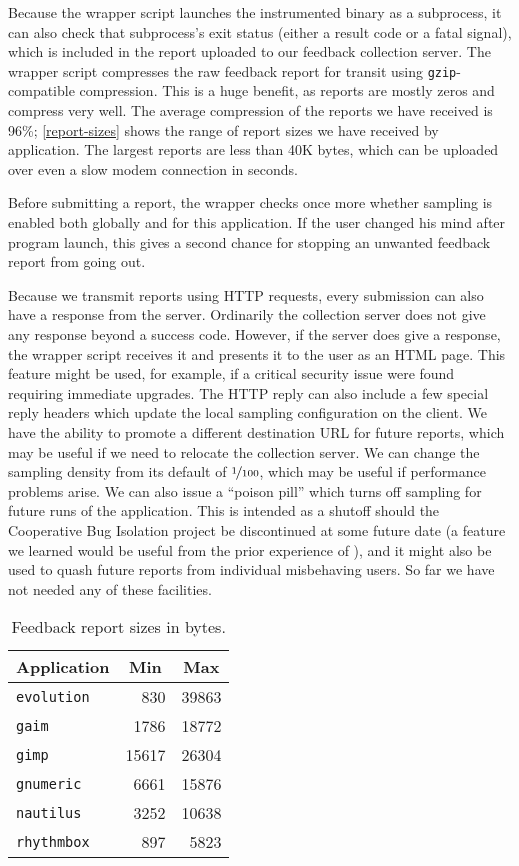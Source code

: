 \documentclass[10pt,twocolumn]{article}
\newcommand{\evolution}{\texttt{evolution}\xspace}
\newcommand{\gaim}{\texttt{gaim}\xspace}
\newcommand{\gimp}{\texttt{gimp}\xspace}
\newcommand{\gnumeric}{\texttt{gnumeric}\xspace}
\newcommand{\nautilus}{\texttt{nautilus}\xspace}
\newcommand{\rhythmbox}{\texttt{rhythmbox}\xspace}
\newcommand{\header}[1]{\multicolumn{1}{c}{#1}}
\begin{document}
Because the wrapper script launches the instrumented binary as a
subprocess, it can also check that subprocess's exit status (either a
result code or a fatal signal), which is included in the report
uploaded to our feedback collection server.
The wrapper script compresses the raw feedback report for transit
using \texttt{gzip}-compatible compression.  This is a huge benefit, as reports
are mostly zeros and compress very well.  The average compression
of the reports we have received is 96\%; \autoref{report-sizes} shows
the range of report sizes we have received by application.  
The largest reports are less than 40K bytes, which can be uploaded
over even a slow modem connection in seconds.

Before submitting a report, the wrapper checks once more whether
sampling is enabled both globally and for this application.  If the
user changed his mind after program launch, this gives a second chance
for stopping an unwanted feedback report from going out.

Because we transmit reports using HTTP requests, every submission
can also have a response from the server.
Ordinarily the collection server does not give any response beyond a
success code.  However, if the server does give a response, the
wrapper script receives it and presents it to the user as an HTML
page.  This feature might be used, for example, if a critical security
issue were found requiring immediate upgrades.  
The HTTP reply can also include a few special reply headers which
update the local sampling configuration on the client.  We have the
ability to promote a different destination URL for future reports,
which may be useful if we need to relocate the collection server.  We
can change the sampling density from its default of $\nicefrac{1}{100}$, which may be
useful if performance problems arise.  We can also issue a ``poison
pill'' which turns off sampling for future runs of the application.
This is intended as a shutoff should the Cooperative Bug
Isolation project be discontinued at some future date (a feature we
learned would be useful from the prior experience of \cite{Elbaum:2003:DISATA}), and it might also
be used to quash future reports from individual misbehaving users.  So
far we have not needed any of these facilities.  

\begin{table}
  \centering
  \begin{tabular}{lrr}
    \header{Application} & \header{Min} & \header{Max} \\ \hline
    \evolution & 830 & 39863  \\
    \gaim & 1786 & 18772  \\
    \gimp & 15617 & 26304  \\
    \gnumeric & 6661 & 15876  \\
    \nautilus & 3252 & 10638  \\
    \rhythmbox & 897 & 5823 
  \end{tabular}
  \caption{Feedback report sizes in bytes.}
  \label{report-sizes}
\end{table}
\end{document}
